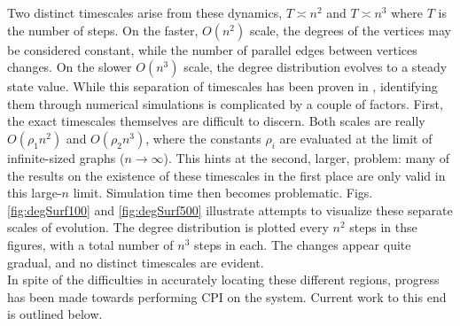 \documentclass[11pt]{article}
\begin{document}
Two distinct timescales arise from these dynamics, $T\asymp n^{2}$ and $T\asymp n^{3}$ where $T$ is the number of steps. On the faster, $O(n^{2})$ scale, the degrees of the vertices may be considered constant, while the number of parallel edges between vertices changes. On the slower $O(n^{3})$ scale, the degree distribution evolves to a steady state value. While this separation of timescales has been proven in \cite{balazs:rsa12}, identifying them through numerical simulations is complicated by a couple of factors. First, the exact timescales themselves are difficult to discern. Both scales are really $O(\rho_{1} n^{2})$ and $O(\rho_{2} n^{3})$, where the constants $\rho_{i}$ are evaluated at the limit of infinite-sized graphs ($n\rightarrow \infty$). This hints at the second, larger, problem: many of the results on the existence of these timescales in the first place are only valid in this large-$n$ limit. Simulation time then becomes problematic. Figs. \ref{fig:degSurf100} and \ref{fig:degSurf500} illustrate attempts to visualize these separate scales of evolution. The degree distribution is plotted every $n^{2}$ steps in thse figures, with a total number of $n^{3}$ steps in each. The changes appear quite gradual, and no distinct timescales are evident.\\
\indent In spite of the difficulties in accurately locating these different regions, progress has been made towards performing CPI on the system. Current work to this end is outlined below.
\clearpage
\end{document}
